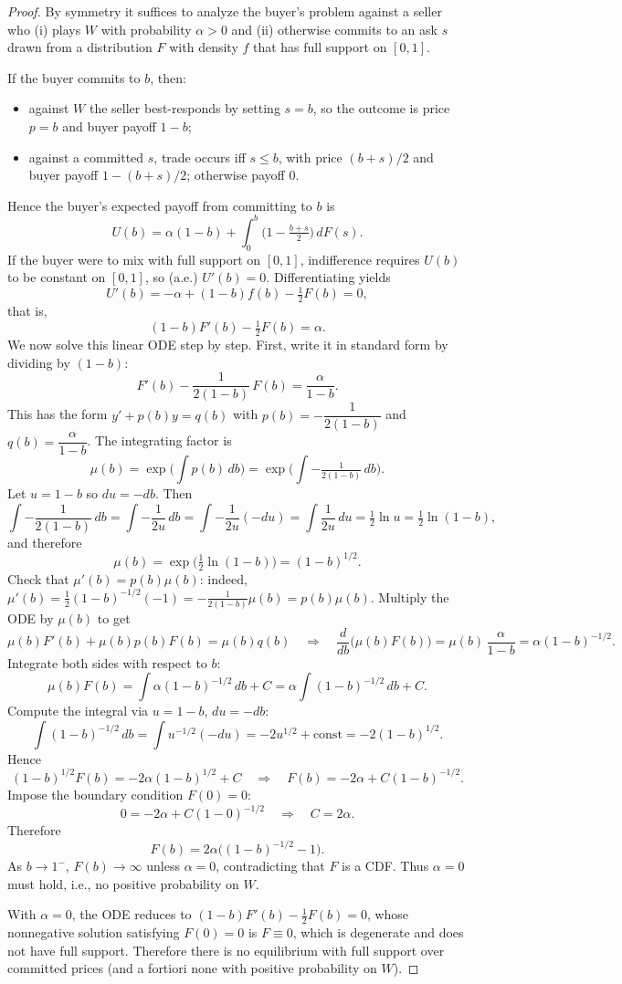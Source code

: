 \documentclass{article}
\begin{document}
\begin{proof}
By symmetry it suffices to analyze the buyer's problem against a seller who (i) plays $W$ with probability $\alpha>0$ and (ii) otherwise commits to an ask $s$ drawn from a distribution $F$ with density $f$ that has full support on $[0,1]$.

If the buyer commits to $b$, then:
\begin{itemize}
    \item against $W$ the seller best-responds by setting $s=b$, so the outcome is price $p=b$ and buyer payoff $1-b$;
    \item against a committed $s$, trade occurs iff $s\le b$, with price $(b+s)/2$ and buyer payoff $1-(b+s)/2$; otherwise payoff $0$.
\end{itemize}
Hence the buyer's expected payoff from committing to $b$ is
\[
U(b)=\alpha(1-b)+\int_{0}^{b}\Big(1-\tfrac{b+s}{2}\Big)\,dF(s).
\]
If the buyer were to mix with full support on $[0,1]$, indifference requires $U(b)$ to be constant on $[0,1]$, so (a.e.) $U'(b)=0$. Differentiating yields
\[
U'(b)=-\alpha+(1-b)f(b)-\tfrac{1}{2}F(b)=0,
\]
that is,
\[
(1-b)F'(b)-\tfrac{1}{2}F(b)=\alpha.
\]
We now solve this linear ODE step by step. First, write it in standard form by dividing by $(1-b)$:
\[
F'(b)-\frac{1}{2(1-b)}\,F(b)=\frac{\alpha}{1-b}.
\]
This has the form $y'+p(b)y=q(b)$ with $p(b)=-\dfrac{1}{2(1-b)}$ and $q(b)=\dfrac{\alpha}{1-b}$. The integrating factor is
\[
\mu(b)=\exp\Big(\int p(b)\,db\Big)=\exp\Big(\int -\tfrac{1}{2(1-b)}\,db\Big).
\]
Let $u=1-b$ so $du=-db$. Then
\[
\int -\frac{1}{2(1-b)}\,db=\int -\frac{1}{2u}\,db=\int -\frac{1}{2u}(-du)=\int \frac{1}{2u}\,du=\tfrac{1}{2}\ln u=\tfrac{1}{2}\ln(1-b),
\]
and therefore
\[
\mu(b)=\exp\big(\tfrac{1}{2}\ln(1-b)\big)=(1-b)^{1/2}.
\]
Check that $\mu'(b)=p(b)\mu(b)$: indeed, $\mu'(b)=\tfrac{1}{2}(1-b)^{-1/2}(-1)=-\tfrac{1}{2(1-b)}\mu(b)=p(b)\mu(b)$. Multiply the ODE by $\mu(b)$ to get
\[
\mu(b)F'(b)+\mu(b)p(b)F(b)=\mu(b)q(b)\quad\Longrightarrow\quad \frac{d}{db}\big(\mu(b)F(b)\big)=\mu(b)\,\frac{\alpha}{1-b}=\alpha(1-b)^{-1/2}.
\]
Integrate both sides with respect to $b$:
\[
\mu(b)F(b)=\int \alpha(1-b)^{-1/2}\,db+C=\alpha\int (1-b)^{-1/2}\,db+C.
\]
Compute the integral via $u=1-b$, $du=-db$:
\[
\int (1-b)^{-1/2}\,db=\int u^{-1/2}(-du)=-2u^{1/2}+\text{const}=-2(1-b)^{1/2}.
\]
Hence
\[
(1-b)^{1/2}F(b)=-2\alpha(1-b)^{1/2}+C\quad\Longrightarrow\quad F(b)=-2\alpha+C(1-b)^{-1/2}.
\]
Impose the boundary condition $F(0)=0$:
\[
0=-2\alpha+C(1-0)^{-1/2}\quad\Longrightarrow\quad C=2\alpha.
\]
Therefore
\[
F(b)=2\alpha\Big((1-b)^{-1/2}-1\Big).
\]
As $b\to1^{-}$, $F(b)\to\infty$ unless $\alpha=0$, contradicting that $F$ is a CDF. Thus $\alpha=0$ must hold, i.e., no positive probability on $W$.

With $\alpha=0$, the ODE reduces to $(1-b)F'(b)-\tfrac{1}{2}F(b)=0$, whose nonnegative solution satisfying $F(0)=0$ is $F\equiv0$, which is degenerate and does not have full support. Therefore there is no equilibrium with full support over committed prices (and a fortiori none with positive probability on $W$).
\end{proof}
\end{document}
